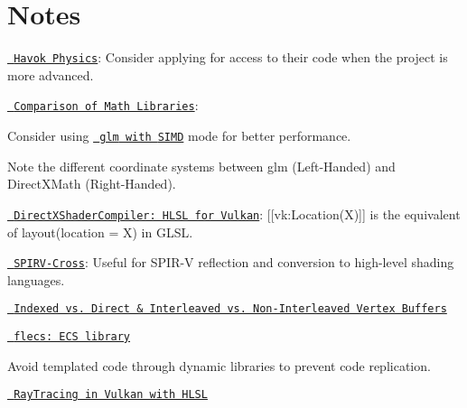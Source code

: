 \chapter{Notes}
\hypertarget{md_markdown_2_notes}{}\label{md_markdown_2_notes}
\label{md_markdown_2_notes_autotoc_md0}%
%



\begin{DoxyItemize}
\item \href{https://www.havok.com/havok-physics/}{\texttt{ Havok Physics}}\+: Consider applying for access to their code when the project is more advanced.
\item \href{https://bargor.github.io/Comparison-of-3d-math-libraries/}{\texttt{ Comparison of Math Libraries}}\+:
\begin{DoxyItemize}
\item Consider using \href{https://glm.g-truc.net/0.9.1/api/a00002.html}{\texttt{ {\ttfamily glm} with {\ttfamily SIMD}}} mode for better performance.
\item Note the different coordinate systems between {\ttfamily glm} (Left-\/\+Handed) and {\ttfamily Direct\+XMath} (Right-\/\+Handed).
\end{DoxyItemize}
\item \href{https://github.com/microsoft/DirectXShaderCompiler/blob/main/docs/SPIR-V.rst\#hlsl-semantic-and-vulkan-location}{\texttt{ Direct\+XShader\+Compiler\+: HLSL for Vulkan}}\+: {\ttfamily \mbox{[}\mbox{[}vk\+:Location(\+X)\mbox{]}\mbox{]}} is the equivalent of {\ttfamily layout(location = X)} in GLSL.
\item \href{https://github.com/KhronosGroup/SPIRV-Cross}{\texttt{ SPIRV-\/\+Cross}}\+: Useful for {\ttfamily SPIR-\/V} reflection and conversion to high-\/level shading languages.
\item \href{https://stackoverflow.com/questions/17503787/vertex-buffers-indexed-or-direct-interlaced-or-separate}{\texttt{ Indexed vs. Direct \& Interleaved vs. Non-\/\+Interleaved Vertex Buffers}}
\item \href{https://github.com/SanderMertens/flecs}{\texttt{ flecs\+: ECS library}}
\item Avoid templated code through dynamic libraries to prevent code replication.
\item \href{https://github.com/microsoft/DirectXShaderCompiler/blob/9c6b2c1275e41cc385b2034aa2716ec2303a62d6/docs/SPIR-V.rst\#raytracing-in-vulkan-and-spirv}{\texttt{ Ray\+Tracing in Vulkan with HLSL}}

\end{DoxyItemize}
